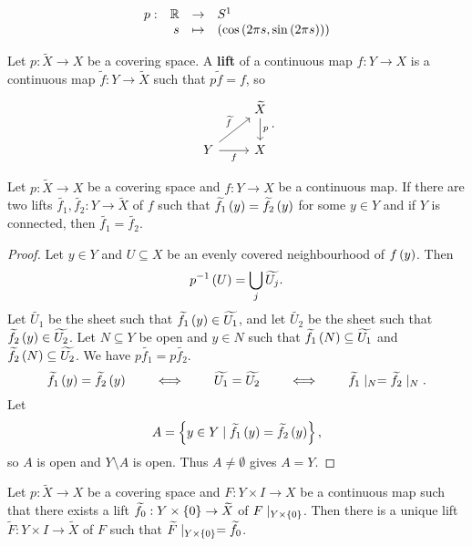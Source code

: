 \begin{example*}
$$ \function[p]{\R}{S^1}{s}{\rb{\cos\rb{2\pi s, \sin\rb{2\pi s}}}} $$
\end{example*}

\begin{definition*}
Let $ p : \widetilde{X} \to X $ be a covering space. A \textbf{lift} of a continuous map $ f : Y \to X $ is a continuous map $ \widetilde{f} : Y \to \widetilde{X} $ such that $ p\widetilde{f} = f $, so
$$
\begin{tikzcd}
& \widetilde{X} \arrow{d}{p} \\
Y \arrow{ur}{\widetilde{f}} \arrow[swap]{r}{f} & X
\end{tikzcd}.
$$
\end{definition*}

\begin{proposition}
\label{prop:1.34}
Let $ p : \widetilde{X} \to X $ be a covering space and $ f : Y \to X $ be a continuous map. If there are two lifts $ \widetilde{f_1}, \widetilde{f_2} : Y \to \widetilde{X} $ of $ f $ such that $ \widetilde{f_1}\left( y \right) = \widetilde{f_2}\left( y \right) $ for some $ y \in Y $ and if $ Y $ is connected, then $ \widetilde{f_1} = \widetilde{f_2} $.
\end{proposition}

\begin{proof}
Let $ y \in Y $ and $ U \subseteq X $ be an evenly covered neighbourhood of $ f\left( y \right) $. Then
$$ p^{-1}\left( U \right) = \bigcup_j \widetilde{U_j}. $$
Let $ \widetilde{U_1} $ be the sheet such that $ \widetilde{f_1}\left( y \right) \in \widetilde{U_1} $, and let $ \widetilde{U_2} $ be the sheet such that $ \widetilde{f_2}\left( y \right) \in \widetilde{U_2} $. Let $ N \subseteq Y $ be open and $ y \in N $ such that $ \widetilde{f_1}\left( N \right) \subseteq \widetilde{U_1} $ and $ \widetilde{f_2}\left( N \right) \subseteq \widetilde{U_2} $. We have $ p\widetilde{f_1} = p\widetilde{f_2} $.
$$ \widetilde{f_1}\left( y \right) = \widetilde{f_2}\left( y \right) \qquad \iff \qquad \widetilde{U_1} = \widetilde{U_2} \qquad \iff \qquad \widetilde{f_1} \mid_N = \widetilde{f_2} \mid_N. $$
Let
$$ A = \left\{ y \in Y \mid \widetilde{f_1}\left( y \right) = \widetilde{f_2}\left( y \right) \right\}, $$
so $ A $ is open and $ Y \setminus A $ is open. Thus $ A \ne \emptyset $ gives $ A = Y $.
\end{proof}

\begin{proposition}
\label{prop:1.30}
Let $ p : \widetilde{X} \to X $ be a covering space and $ F : Y \times I \to X $ be a continuous map such that there exists a lift $ \widetilde{f_0} : Y \times \left\{ 0 \right\} \to \widetilde{X} $ of $ F \mid_{Y \times \left\{ 0 \right\}} $. Then there is a unique lift $ \widetilde{F} : Y \times I \to \widetilde{X} $ of $ F $ such that $ \widetilde{F} \mid_{Y \times \left\{ 0 \right\}} = \widetilde{f_0} $.
\end{proposition}

